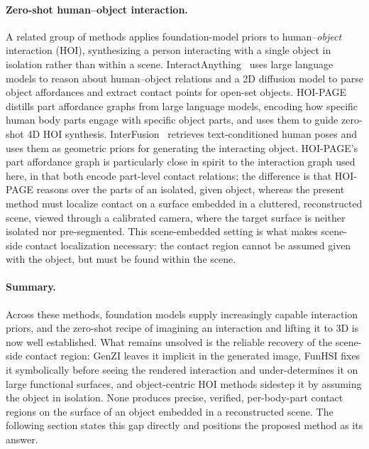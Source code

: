 \paragraph{Zero-shot human--object interaction.} A related group of methods applies foundation-model priors to human--\emph{object} interaction (HOI), synthesizing a person interacting with a single object in isolation rather than within a scene. InteractAnything~\cite{zhang2025interactanything} uses large language models to reason about human--object relations and a 2D diffusion model to parse object affordances and extract contact points for open-set objects. HOI-PAGE~\cite{li2025hoipage} distills part affordance graphs from large language models, encoding how specific human body parts engage with specific object parts, and uses them to guide zero-shot 4D HOI synthesis. InterFusion~\cite{dai2024interfusion} retrieves text-conditioned human poses and uses them as geometric priors for generating the interacting object. HOI-PAGE's part affordance graph is particularly close in spirit to the interaction graph used here, in that both encode part-level contact relations; the difference is that HOI-PAGE reasons over the parts of an isolated, given object, whereas the present method must localize contact on a surface embedded in a cluttered, reconstructed scene, viewed through a calibrated camera, where the target surface is neither isolated nor pre-segmented. This scene-embedded setting is what makes scene-side contact localization necessary: the contact region cannot be assumed given with the object, but must be found within the scene.

\paragraph{Summary.} Across these methods, foundation models supply increasingly capable interaction priors, and the zero-shot recipe of imagining an interaction and lifting it to 3D is now well established. What remains unsolved is the reliable recovery of the scene-side contact region: GenZI leaves it implicit in the generated image, FunHSI fixes it symbolically before seeing the rendered interaction and under-determines it on large functional surfaces, and object-centric HOI methods sidestep it by assuming the object in isolation. None produces precise, verified, per-body-part contact regions on the surface of an object embedded in a reconstructed scene. The following section states this gap directly and positions the proposed method as its answer.

